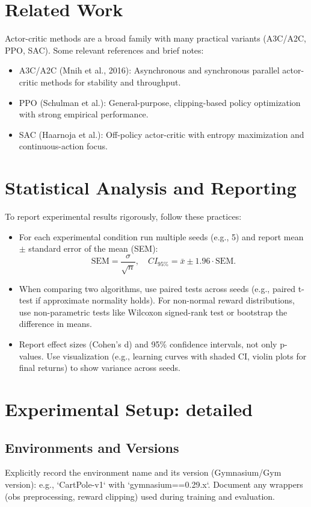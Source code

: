 \documentclass[11pt]{article}
\begin{document}
\section{Related Work}
Actor-critic methods are a broad family with many practical variants (A3C/A2C, PPO, SAC). Some relevant references and brief notes:
\begin{itemize}
  \item A3C/A2C (Mnih et al., 2016): Asynchronous and synchronous parallel actor-critic methods for stability and throughput.
  \item PPO (Schulman et al.): General-purpose, clipping-based policy optimization with strong empirical performance.
  \item SAC (Haarnoja et al.): Off-policy actor-critic with entropy maximization and continuous-action focus.
\end{itemize}

\section{Statistical Analysis and Reporting}
To report experimental results rigorously, follow these practices:
\begin{itemize}
  \item For each experimental condition run multiple seeds (e.g., 5) and report mean $\pm$ standard error of the mean (SEM):
    \begin{equation}
      \text{SEM} = \frac{\sigma}{\sqrt{n}}, \quad CI_{95\%} = \bar{x} \pm 1.96\cdot\text{SEM}.
    \end{equation}
  \item When comparing two algorithms, use paired tests across seeds (e.g., paired t-test if approximate normality holds). For non-normal reward distributions, use non-parametric tests like Wilcoxon signed-rank test or bootstrap the difference in means.
  \item Report effect sizes (Cohen's d) and 95\% confidence intervals, not only p-values. Use visualization (e.g., learning curves with shaded CI, violin plots for final returns) to show variance across seeds.
\end{itemize}

\section{Experimental Setup: detailed}
\subsection{Environments and Versions}
Explicitly record the environment name and its version (Gymnasium/Gym version): e.g., `CartPole-v1` with `gymnasium==0.29.x`. Document any wrappers (obs preprocessing, reward clipping) used during training and evaluation.
\end{document}
